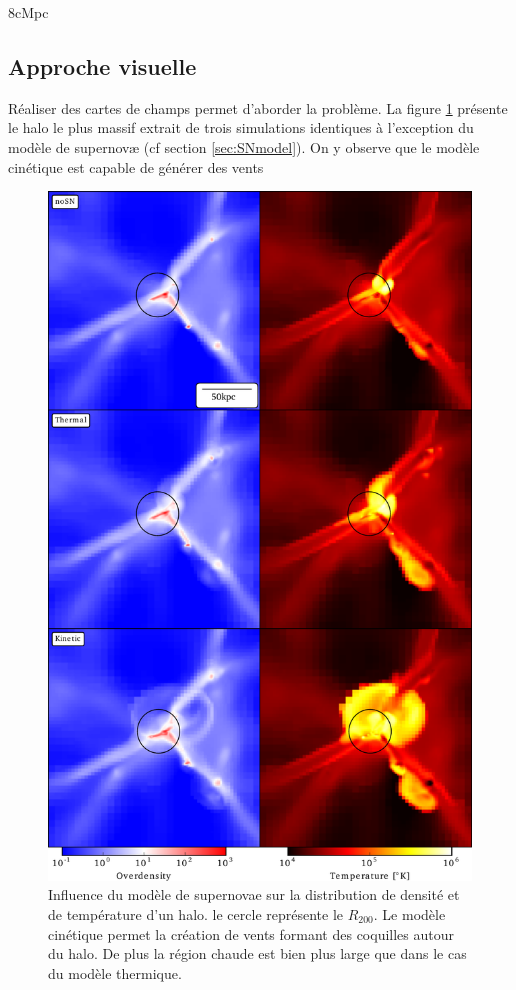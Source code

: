 8cMpc


\subsection{Approche visuelle}

Réaliser des cartes de champs permet d'aborder la problème.
La figure \ref{fig:halo} présente le halo le plus massif extrait de trois simulations identiques à l’exception du modèle de supernovæ (cf section \ref{sec:SNmodel}).
On y observe que le modèle cinétique est capable de générer des vents 

\begin{figure}
		\includegraphics[width=.95\linewidth]{img/03/halos.pdf}
        \caption{Influence du modèle de supernovae sur la distribution de densité et de température d'un halo.
        le cercle représente le $R_{200}$.
        Le modèle cinétique permet la création de vents formant des coquilles autour du halo.
        De plus la région chaude est bien plus large que dans le cas du modèle thermique.
 		\label{fig:halo}}
\end{figure}


